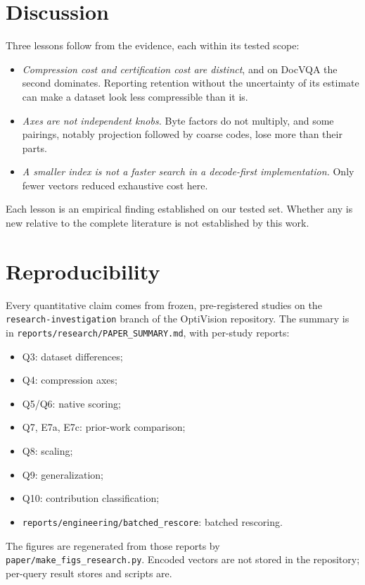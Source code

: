 \documentclass[conference]{IEEEtran}
\begin{document}
\section{Discussion}
\label{sec:discussion}

Three lessons follow from the evidence, each within its tested scope:
\begin{itemize}
\item \emph{Compression cost and certification cost are distinct}, and on DocVQA the
second dominates. Reporting retention without the uncertainty of its estimate can make
a dataset look less compressible than it is.
\item \emph{Axes are not independent knobs.} Byte factors do not multiply, and some
pairings, notably projection followed by coarse codes, lose more than their parts.
\item \emph{A smaller index is not a faster search in a decode-first implementation.}
Only fewer vectors reduced exhaustive cost here.
\end{itemize}
Each lesson is an empirical finding established on our tested set. Whether any is new
relative to the complete literature is not established by this work.

\section{Reproducibility}
\label{sec:repro}

Every quantitative claim comes from frozen, pre-registered studies on the
\texttt{research-investigation} branch of the OptiVision repository. The summary is in
\texttt{reports/research/PAPER\_SUMMARY.md}, with per-study reports:
\begin{itemize}
\item Q3: dataset differences;
\item Q4: compression axes;
\item Q5/Q6: native scoring;
\item Q7, E7a, E7c: prior-work comparison;
\item Q8: scaling;
\item Q9: generalization;
\item Q10: contribution classification;
\item \texttt{reports/engineering/batched\_rescore}: batched rescoring.
\end{itemize}
The figures are regenerated from those reports by \texttt{paper/make\_figs\_research.py}.
Encoded vectors are not stored in the repository; per-query result stores and scripts
are.
\end{document}
